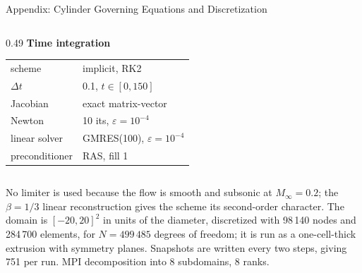 \documentclass[aspectratio=169]{beamer}
\begin{document}
\begin{frame}{Appendix: Cylinder Governing Equations and Discretization}
\begin{columns}[T,onlytextwidth]
\begin{column}{0.49\textwidth}
\vspace{0.5em}
\textbf{Time integration}
\begin{tabular}{ll}
scheme            & implicit, RK2 \\
$\Delta t$        & 0.1, $t\in[0,150]$ \\
Jacobian          & exact matrix-vector \\
Newton            & 10 its, $\varepsilon=10^{-4}$ \\
linear solver     & GMRES(100), $\varepsilon=10^{-4}$ \\
preconditioner    & RAS, fill 1
\end{tabular}
\end{column}
\end{columns}

\vspace{0.4em}
{\tiny No limiter is used because the flow is smooth and subsonic at $M_\infty=0.2$; the
$\beta=1/3$ linear reconstruction gives the scheme its second-order character. The
domain is $[-20,20]^2$ in units of the diameter, discretized with 98\,140 nodes and
284\,700 elements, for $N=499\,485$ degrees of freedom; it is run as a one-cell-thick
extrusion with symmetry planes. Snapshots are written every two steps, giving 751 per
run. MPI decomposition into 8 subdomains, 8 ranks.}
\end{frame}
\end{document}
